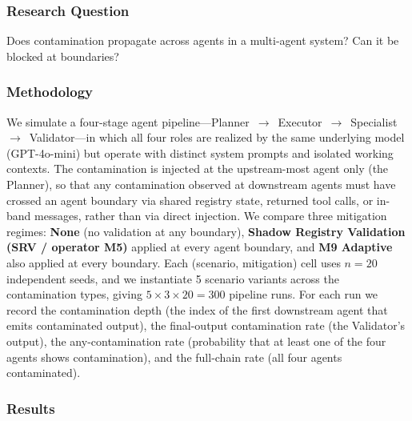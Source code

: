 \documentclass{article}
\theoremstyle{plain}
\theoremstyle{definition}
\begin{document}
\subsubsection{Research Question}

Does contamination propagate across agents in a multi-agent system? Can it be blocked at boundaries?

\subsubsection{Methodology}

We simulate a four-stage agent pipeline---Planner~$\to$~Executor~$\to$~Specialist~$\to$~Validator---in which all four roles are realized by the same underlying model (GPT-4o-mini) but operate with distinct system prompts and isolated working contexts. The contamination is injected at the upstream-most agent only (the Planner), so that any contamination observed at downstream agents must have crossed an agent boundary via shared registry state, returned tool calls, or in-band messages, rather than via direct injection. We compare three mitigation regimes: \textbf{None} (no validation at any boundary), \textbf{Shadow Registry Validation (SRV / operator M5)} applied at every agent boundary, and \textbf{M9 Adaptive} also applied at every boundary. Each (scenario, mitigation) cell uses $n=20$ independent seeds, and we instantiate 5 scenario variants across the contamination types, giving $5 \times 3 \times 20 = 300$ pipeline runs. For each run we record the contamination depth (the index of the first downstream agent that emits contaminated output), the final-output contamination rate (the Validator's output), the any-contamination rate (probability that at least one of the four agents shows contamination), and the full-chain rate (all four agents contaminated).

\subsubsection{Results}
\end{document}
